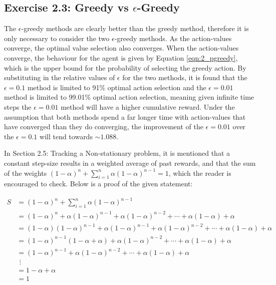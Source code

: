 \subsection*{Exercise 2.3: Greedy vs \boldmath$\epsilon$-Greedy}

The $\epsilon$-greedy methods are clearly better than the greedy method, therefore it is only necessary to consider the two $\epsilon$-greedy methods. As the action-values converge, the optimal value selection also converges. When the action-values converge, the behaviour for the agent is given by Equation \ref{eqn:2_pgreedy}, which is the upper bound for the probability of selecting the greedy action. By substituting in the relative values of $\epsilon$ for the two methods, it is found that the $\epsilon=0.1$ method is limited to 91\% optimal action selection and the $\epsilon=0.01$ method is limited to 99.01\% optimal action selection, meaning given infinite time steps the $\epsilon=0.01$ method will have a higher cumulative reward. Under the assumption that both methods spend a far longer time with action-values that have converged than they do converging, the improvement of the $\epsilon=0.01$ over the $\epsilon=0.1$ will tend towards $\sim 1.088$.

\begin{tcolorbox}
In Section 2.5: Tracking a Non-stationary problem, it is mentioned that a constant step-size results in a weighted average of past rewards, and that the sum of the weights $(1-\alpha)^n + \sum_{i=1}^{n} \alpha(1-\alpha)^{n-1}=1$, which the reader is encouraged to check. Below is a proof of the given statement: 

\vspace{-6mm}
\begin{align*}
S &= (1-\alpha)^n + \sum_{i=1}^{n} \alpha(1-\alpha)^{n-1}  \\
&= (1-\alpha)^n + \alpha(1-\alpha)^{n-1} + \alpha(1-\alpha)^{n-2} + \cdots + \alpha(1-\alpha) + \alpha \\
&= (1-\alpha)(1-\alpha)^{n-1} + \alpha(1-\alpha)^{n-1} + \alpha(1-\alpha)^{n-2} + \cdots + \alpha(1-\alpha) + \alpha \\
&= (1-\alpha)^{n-1}(1-\alpha+\alpha) + \alpha(1-\alpha)^{n-2} + \cdots + \alpha(1-\alpha) + \alpha \\
&= (1-\alpha)^{n-1} + \alpha(1-\alpha)^{n-2} + \cdots + \alpha(1-\alpha) + \alpha \\
& \ \, \vdots \\
&= 1-\alpha+\alpha \\
&=1
\end{align*}

\end{tcolorbox}
 	

